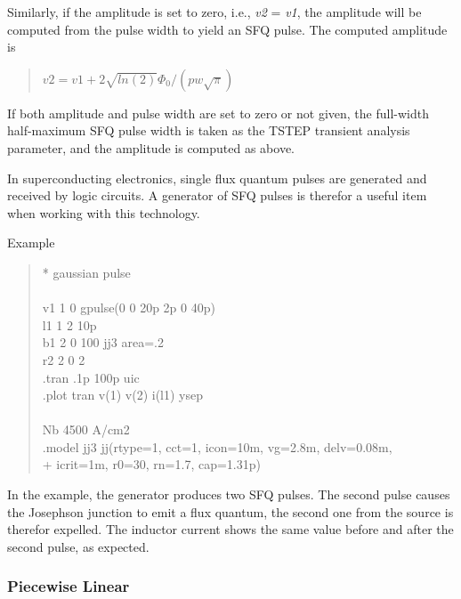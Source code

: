 Similarly, if the amplitude is set to zero, i.e., {\it v2} = {\it
v1\/}, the amplitude will be computed from the pulse width to yield an
SFQ pulse.  The computed amplitude is
\begin{quote}
$v2 = v1 + 2\sqrt{ln(2)}\Phi_0/(pw\sqrt\pi)$
\end{quote}

If both amplitude and pulse width are set to zero or not given, the
full-width half-maximum SFQ pulse width is taken as the TSTEP
transient analysis parameter, and the amplitude is computed as above.

In superconducting electronics, single flux quantum pulses are
generated and received by logic circuits.  A generator of SFQ pulses
is therefor a useful item when working with this technology.

Example
\begin{quote}\vt
* gaussian pulse\\
\\
v1 1 0 gpulse(0 0 20p 2p 0 40p)\\
l1 1 2 10p\\
b1 2 0 100 jj3 area=.2\\
r2 2 0 2\\
.tran .1p 100p uic\\
.plot tran v(1) v(2) i(l1) ysep\\
\\
\vt * Nb 4500 A/cm2\\
.model jj3 jj(rtype=1, cct=1, icon=10m, vg=2.8m, delv=0.08m,\\
+ icrit=1m, r0=30, rn=1.7, cap=1.31p)
\end{quote}

In the example, the generator produces two SFQ pulses.  The second
pulse causes the Josephson junction to emit a flux quantum, the
second one from the source is therefor expelled.  The inductor
current shows the same value before and after the second pulse,
as expected.

\subsubsection{Piecewise Linear}



